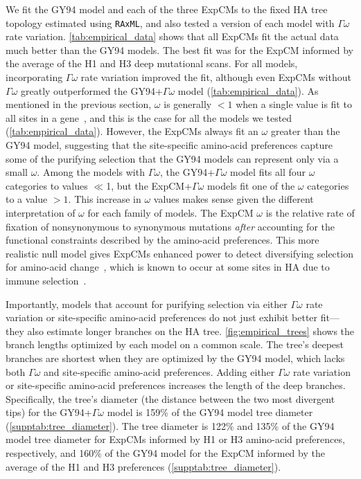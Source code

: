 \documentclass[11pt]{article}
\begin{document}
We fit the GY94 model and each of the three ExpCMs to the fixed HA tree topology estimated using \texttt{RAxML}, and also tested a version of each model with $\Gamma\omega$ rate variation.
\ref{tab:empirical_data} shows that all ExpCMs fit the actual data much better than the GY94 models.
The best fit was for the ExpCM informed by the average of the H1 and H3 deep mutational scans.
For all models, incorporating $\Gamma\omega$ rate variation improved the fit, although even ExpCMs without $\Gamma\omega$ greatly outperformed the GY94+$\Gamma\omega$ model (\ref{tab:empirical_data}).
As mentioned in the previous section, $\omega$ is generally $<1$ when a single value is fit to all sites in a gene~\citep{murrell2015gene}, and this is the case for all the models we tested (\ref{tab:empirical_data}).
However, the ExpCMs always fit an $\omega$ greater than the GY94 model, suggesting that the site-specific amino-acid preferences capture some of the purifying selection that the GY94 models can represent only via a small $\omega$.
Among the models with $\Gamma\omega$, the GY94+$\Gamma\omega$ model fits all four $\omega$ categories to values $\ll$1, but the ExpCM+$\Gamma\omega$ models fit one of the $\omega$ categories to a value $>1$.
This increase in $\omega$ values makes sense given the different interpretation of $\omega$ for each family of models. 
The ExpCM $\omega$ is the relative rate of fixation of nonsynonymous to synonymous mutations \textit{after} accounting for the functional constraints described by the amino-acid preferences.
This more realistic null model gives ExpCMs enhanced power to detect diversifying selection for amino-acid change~\citep{bloom2017identification, rodrigue2017detecting}, which is known to occur at some sites in HA due to immune selection~\citep{bedford2014integrating}.

Importantly, models that account for purifying selection via either $\Gamma\omega$ rate variation or site-specific amino-acid preferences do not just exhibit better fit---they also estimate longer branches on the HA tree. 
\ref{fig:empirical_trees} shows the branch lengths optimized by each model on a common scale.
The tree's deepest branches are shortest when they are optimized by the GY94 model, which lacks both $\Gamma\omega$ and site-specific amino-acid preferences.
Adding either $\Gamma\omega$ rate variation or site-specific amino-acid preferences increases the length of the deep branches.
Specifically, the tree's diameter (the distance between the two most divergent tips) for the GY94+$\Gamma\omega$ model is 159\% of the GY94 model tree diameter (\ref{supptab:tree_diameter}).
The tree diameter is 122\% and 135\% of the GY94 model tree diameter for ExpCMs informed by H1 or H3 amino-acid preferences, respectively, and 160\% of the GY94 model for the ExpCM informed by the average of the H1 and H3 preferences (\ref{supptab:tree_diameter}).
\end{document}
